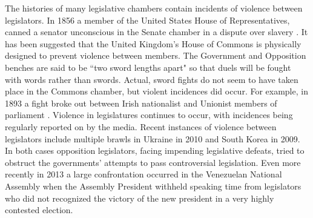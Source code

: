 \documentclass[a4paper]{article}\usepackage[]{graphicx}\usepackage[]{color}
\begin{document}
The histories of many legislative chambers contain incidents of violence between legislators. In 1856 a member of the United States House of Representatives, canned a senator unconscious in the Senate chamber in a dispute over slavery \citep{USSenateCanning}. It has been suggested that the United Kingdom's House of Commons is physically designed to prevent violence between members. The Government and Opposition benches are said to be ``two sword lengths apart" \citep{ParliamentUKSword} so that duels will be fought with words rather than swords. Actual, sword fights do not seem to have taken place in the Commons chamber, but violent incidences did occur. For example, in 1893 a fight broke out between Irish nationalist and Unionist members of parliament \citep{ByrneViolence}. Violence in legislatures continues to occur, with incidences being regularly reported on by the media. Recent instances of violence between legislators include multiple brawls in Ukraine in 2010 and South Korea in 2009. In both cases opposition legislators, facing impending legislative defeats, tried to obstruct the governments' attempts to pass controversial legislation. Even more recently in 2013 a large confrontation occurred in the Venezuelan National Assembly when the Assembly President withheld speaking time from legislators who did not recognized the victory of the new president in a very highly contested election.
\end{document}

